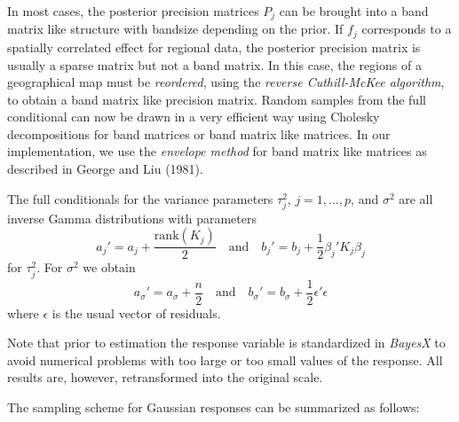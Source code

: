 \documentclass[11pt,a4paper,twoside]{bayesxarticle}
\begin{document}
In most cases, the posterior precision matrices $P_j$ can be brought
into a band matrix like structure with bandsize depending on the
prior. If $f_j$ corresponds to a spatially correlated effect for
regional data, the posterior precision matrix is usually a sparse
matrix but not a band matrix. In this case, the regions of a
geographical map must be {\em reordered}, using the {\em reverse
Cuthill-McKee algorithm}, to obtain a band matrix like precision
matrix. Random samples from the full conditional can now be drawn in
a very efficient way using Cholesky decompositions for band matrices
or band matrix like matrices. In our implementation, we use the {\em
envelope method} for band matrix like matrices as described in
George and Liu (1981).

The full conditionals for the variance parameters $\tau^2_j$,
$j=1,\dots,p$, and $\sigma^2$ are all inverse Gamma distributions
with parameters
\begin{equation}
\label{hypab} a_j' = a_j + \frac{\mathrm{rank}(K_j)}{2} \quad
\mbox{and} \quad b_j' = b_j + \frac{1}{2} \beta_j'K_j \beta_j
\end{equation}
for $\tau^2_j$. For $\sigma^2$ we obtain
\begin{equation}
\label{hypabsigma} a_{\sigma}' = a_{\sigma}+\frac{n}{2} \quad
\mbox{and} \quad b_{\sigma}' = b_{\sigma} + \frac{1}{2}
\epsilon'\epsilon
\end{equation}
where $\epsilon$ is the usual vector of residuals.

Note that prior to estimation the response variable is standardized
in {\em BayesX} to avoid numerical problems with too large or too
small values of the response. All results are, however,
retransformed into the original scale.

The sampling scheme for Gaussian responses can be summarized as
follows:
\end{document}
